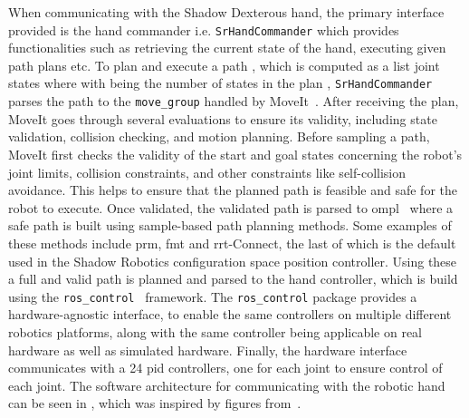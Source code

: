 When communicating with the Shadow Dexterous hand, the primary interface provided is the hand commander i.e. \texttt{SrHandCommander} which provides functionalities such as retrieving the current state of the hand, executing given path plans etc. To plan and execute a path , which is computed as a list joint states  where  with  being the number of states in the plan , \texttt{SrHandCommander} parses the path to the \texttt{move\_group} handled by MoveIt~\cite{reducing-the-barrier-to-entry-of-complex-robotic-software:-a-moveit!-case-study}. After receiving the plan, MoveIt goes through several evaluations to ensure its validity, including state validation, collision checking, and motion planning. Before sampling a path, MoveIt first checks the validity of the start and goal states concerning the robot's joint limits, collision constraints, and other constraints like self-collision avoidance. This helps to ensure that the planned path is feasible and safe for the robot to execute. Once validated, the validated path  is parsed to \gls{ompl}~\cite{the-open-motion-planning-library} where a safe path is built using sample-based path planning methods. Some examples of these methods include \gls{prm}, \gls{fmt} and \gls{rrt}-Connect, the last of which is the default used in the Shadow Robotics configuration space position controller. Using these a full and valid path  is planned and parsed to the hand controller, which is build using the \texttt{ros\_control}~\cite{ros-control} framework. The \texttt{ros\_control} package provides a hardware-agnostic interface, to enable the same controllers on multiple different robotics platforms, along with the same controller being applicable on real hardware as well as simulated hardware. Finally, the hardware interface communicates with a \num{24} \gls{pid} controllers, one for each joint to ensure control of each joint. The software architecture for communicating with the robotic hand can be seen in , which was inspired by figures from~\cite{shadow-robotics-control-description,shadow-robotics-firmware,shadow-robotics-controlling-the-hand}.
